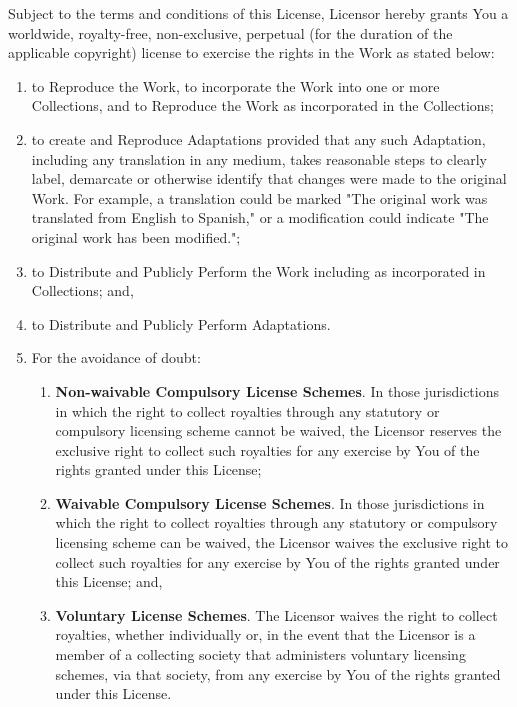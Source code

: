  Subject to the terms
        and conditions of this License, Licensor hereby grants You
        a worldwide, royalty-free, non-exclusive, perpetual (for
        the duration of the applicable copyright) license to
        exercise the rights in the Work as stated below:

\begin{enumerate}
          \item to Reproduce the Work, to incorporate the Work into
          one or more Collections, and to Reproduce the Work as
          incorporated in the Collections;

          \item to create and Reproduce Adaptations provided that any
          such Adaptation, including any translation in any medium,
          takes reasonable steps to clearly label, demarcate or
          otherwise identify that changes were made to the original
          Work. For example, a translation could be marked "The
          original work was translated from English to Spanish," or
          a modification could indicate "The original work has been
          modified.";

          \item to Distribute and Publicly Perform the Work including
          as incorporated in Collections; and,

          \item to Distribute and Publicly Perform Adaptations.

          \item
            For the avoidance of doubt:

\begin{enumerate}
              \item\textbf{Non-waivable Compulsory License
              Schemes}. In those jurisdictions in which the
              right to collect royalties through any statutory or
              compulsory licensing scheme cannot be waived, the
              Licensor reserves the exclusive right to collect such
              royalties for any exercise by You of the rights
              granted under this License;

              \item\textbf{Waivable Compulsory License
              Schemes}. In those jurisdictions in which the
              right to collect royalties through any statutory or
              compulsory licensing scheme can be waived, the
              Licensor waives the exclusive right to collect such
              royalties for any exercise by You of the rights
              granted under this License; and,

              \item\textbf{Voluntary License Schemes}. The
              Licensor waives the right to collect royalties,
              whether individually or, in the event that the
              Licensor is a member of a collecting society that
              administers voluntary licensing schemes, via that
              society, from any exercise by You of the rights
              granted under this License.
\end{enumerate}
          
\end{enumerate}

